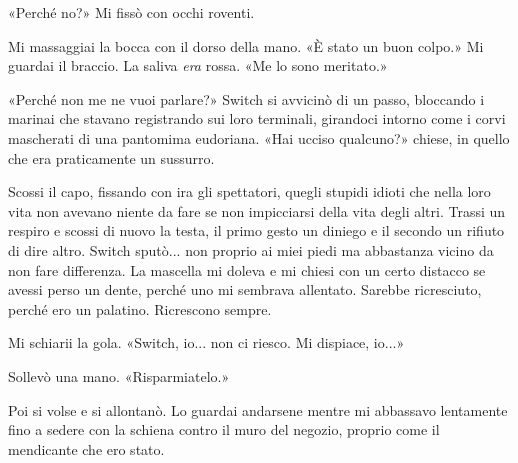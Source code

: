 «Perché no?» Mi fissò con occhi roventi.

Mi massaggiai la bocca con il dorso della mano. «È stato un buon colpo.»
Mi guardai il braccio. La saliva \emph{era} rossa. «Me lo sono
meritato.»

«Perché non me ne vuoi parlare?» Switch si avvicinò di un passo,
bloccando i marinai che stavano registrando sui loro terminali,
girandoci intorno come i corvi mascherati di una pantomima eudoriana.
«Hai ucciso qualcuno?» chiese, in quello che era praticamente un
sussurro.

Scossi il capo, fissando con ira gli spettatori, quegli stupidi idioti
che nella loro vita non avevano niente da fare se non impicciarsi della
vita degli altri. Trassi un respiro e scossi di nuovo la testa, il primo
gesto un diniego e il secondo un rifiuto di dire altro. Switch sputò...
non proprio ai miei piedi ma abbastanza vicino da non fare differenza.
La mascella mi doleva e mi chiesi con un certo distacco se avessi perso
un dente, perché uno mi sembrava allentato. Sarebbe ricresciuto, perché
ero un palatino. Ricrescono sempre.

Mi schiarii la gola. «Switch, io... non ci riesco. Mi dispiace, io...»

Sollevò una mano. «Risparmiatelo.»

Poi si volse e si allontanò. Lo guardai andarsene mentre mi abbassavo
lentamente fino a sedere con la schiena contro il muro del negozio,
proprio come il mendicante che ero stato.

